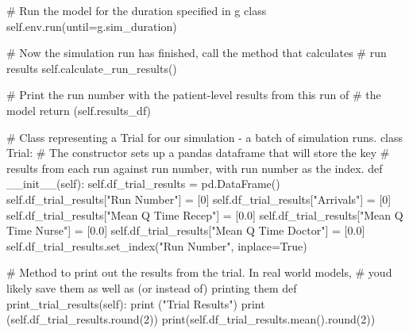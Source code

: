\documentclass[
  letterpaper,
  DIV=11,
  numbers=noendperiod]{scrreprt}
\newenvironment{Shaded}{}{}
\newcommand{\BuiltInTok}[1]{\textcolor[rgb]{0.84,0.23,0.29}{#1}}
\newcommand{\CommentTok}[1]{\textcolor[rgb]{0.42,0.45,0.49}{#1}}
\newcommand{\ControlFlowTok}[1]{\textcolor[rgb]{0.84,0.23,0.29}{#1}}
\newcommand{\DecValTok}[1]{\textcolor[rgb]{0.00,0.36,0.77}{#1}}
\newcommand{\FloatTok}[1]{\textcolor[rgb]{0.00,0.36,0.77}{#1}}
\newcommand{\FunctionTok}[1]{\textcolor[rgb]{0.44,0.26,0.76}{#1}}
\newcommand{\KeywordTok}[1]{\textcolor[rgb]{0.84,0.23,0.29}{#1}}
\newcommand{\NormalTok}[1]{\textcolor[rgb]{0.14,0.16,0.18}{#1}}
\newcommand{\OperatorTok}[1]{\textcolor[rgb]{0.14,0.16,0.18}{#1}}
\newcommand{\StringTok}[1]{\textcolor[rgb]{0.01,0.18,0.38}{#1}}
\newcommand{\VariableTok}[1]{\textcolor[rgb]{0.89,0.38,0.04}{#1}}
\begin{document}
\begin{tcolorbox}
\begin{Shaded}
\begin{Highlighting}[]
        \CommentTok{\# Run the model for the duration specified in g class}
        \VariableTok{self}\NormalTok{.env.run(until}\OperatorTok{=}\NormalTok{g.sim\_duration)}

        \CommentTok{\# Now the simulation run has finished, call the method that calculates}
        \CommentTok{\# run results}
        \VariableTok{self}\NormalTok{.calculate\_run\_results()}

        \CommentTok{\# Print the run number with the patient{-}level results from this run of}
        \CommentTok{\# the model}
        \ControlFlowTok{return}\NormalTok{ (}\VariableTok{self}\NormalTok{.results\_df)}

\CommentTok{\# Class representing a Trial for our simulation {-} a batch of simulation runs.}
\KeywordTok{class}\NormalTok{ Trial:}
    \CommentTok{\# The constructor sets up a pandas dataframe that will store the key}
    \CommentTok{\# results from each run against run number, with run number as the index.}
    \KeywordTok{def}  \FunctionTok{\_\_init\_\_}\NormalTok{(}\VariableTok{self}\NormalTok{):}
        \VariableTok{self}\NormalTok{.df\_trial\_results }\OperatorTok{=}\NormalTok{ pd.DataFrame()}
        \VariableTok{self}\NormalTok{.df\_trial\_results[}\StringTok{"Run Number"}\NormalTok{] }\OperatorTok{=}\NormalTok{ [}\DecValTok{0}\NormalTok{]}
        \VariableTok{self}\NormalTok{.df\_trial\_results[}\StringTok{"Arrivals"}\NormalTok{] }\OperatorTok{=}\NormalTok{ [}\DecValTok{0}\NormalTok{]}
        \VariableTok{self}\NormalTok{.df\_trial\_results[}\StringTok{"Mean Q Time Recep"}\NormalTok{] }\OperatorTok{=}\NormalTok{ [}\FloatTok{0.0}\NormalTok{]}
        \VariableTok{self}\NormalTok{.df\_trial\_results[}\StringTok{"Mean Q Time Nurse"}\NormalTok{] }\OperatorTok{=}\NormalTok{ [}\FloatTok{0.0}\NormalTok{]}
        \VariableTok{self}\NormalTok{.df\_trial\_results[}\StringTok{"Mean Q Time Doctor"}\NormalTok{] }\OperatorTok{=}\NormalTok{ [}\FloatTok{0.0}\NormalTok{]}
        \VariableTok{self}\NormalTok{.df\_trial\_results.set\_index(}\StringTok{"Run Number"}\NormalTok{, inplace}\OperatorTok{=}\VariableTok{True}\NormalTok{)}

    \CommentTok{\# Method to print out the results from the trial.  In real world models,}
    \CommentTok{\# you\textquotesingle{}d likely save them as well as (or instead of) printing them}
    \KeywordTok{def}\NormalTok{ print\_trial\_results(}\VariableTok{self}\NormalTok{):}
        \BuiltInTok{print}\NormalTok{ (}\StringTok{"Trial Results"}\NormalTok{)}
        \BuiltInTok{print}\NormalTok{ (}\VariableTok{self}\NormalTok{.df\_trial\_results.}\BuiltInTok{round}\NormalTok{(}\DecValTok{2}\NormalTok{))}
        \BuiltInTok{print}\NormalTok{(}\VariableTok{self}\NormalTok{.df\_trial\_results.mean().}\BuiltInTok{round}\NormalTok{(}\DecValTok{2}\NormalTok{))}


\end{Highlighting}
\end{Shaded}
\end{tcolorbox}
\end{document}
